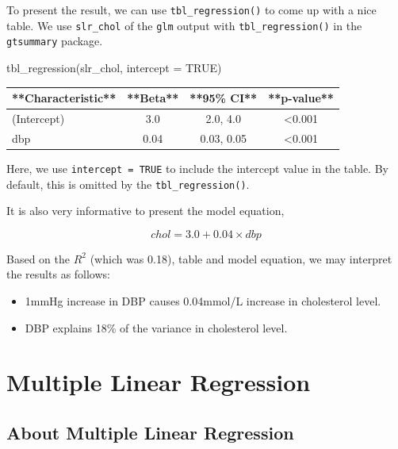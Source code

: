 \documentclass[
  10pt,
]{krantz}
\newenvironment{Shaded}{\begin{snugshade}}{\end{snugshade}}
\newcommand{\AttributeTok}[1]{\textcolor[rgb]{0.77,0.63,0.00}{#1}}
\newcommand{\ConstantTok}[1]{\textcolor[rgb]{0.00,0.00,0.00}{#1}}
\newcommand{\FunctionTok}[1]{\textcolor[rgb]{0.00,0.00,0.00}{#1}}
\newcommand{\NormalTok}[1]{#1}
\providecommand{\tightlist}{%
  \setlength{\itemsep}{0pt}\setlength{\parskip}{0pt}}
\begin{document}
To present the result, we can use \texttt{tbl\_regression()} to come up with a nice table. We use \texttt{slr\_chol} of the \texttt{glm} output with \texttt{tbl\_regression()} in the \texttt{gtsummary} package.

\begin{Shaded}
\begin{Highlighting}[]
\FunctionTok{tbl\_regression}\NormalTok{(slr\_chol, }\AttributeTok{intercept =} \ConstantTok{TRUE}\NormalTok{)}
\end{Highlighting}
\end{Shaded}

\begin{tabular}{l|c|c|c}
\hline
**Characteristic** & **Beta** & **95\% CI** & **p-value**\\
\hline
(Intercept) & 3.0 & 2.0, 4.0 & <0.001\\
\hline
dbp & 0.04 & 0.03, 0.05 & <0.001\\
\hline
\end{tabular}

Here, we use \texttt{intercept\ =\ TRUE} to include the intercept value in the table. By default, this is omitted by the \texttt{tbl\_regression()}.

It is also very informative to present the model equation,

\[chol = 3.0 + 0.04\times dbp\]

Based on the \(R^2\) (which was 0.18), table and model equation, we may interpret the results as follows:

\begin{itemize}
\tightlist
\item
  1mmHg increase in DBP causes 0.04mmol/L increase in cholesterol level.
\item
  DBP explains 18\% of the variance in cholesterol level.
\end{itemize}

\hypertarget{multiple-linear-regression}{%
\section{\texorpdfstring{Multiple Linear Regression}{Multiple Linear Regression}}\label{multiple-linear-regression}}

\hypertarget{about-multiple-linear-regression}{%
\subsection{\texorpdfstring{About Multiple Linear Regression}{About Multiple Linear Regression}}\label{about-multiple-linear-regression}}
\end{document}
